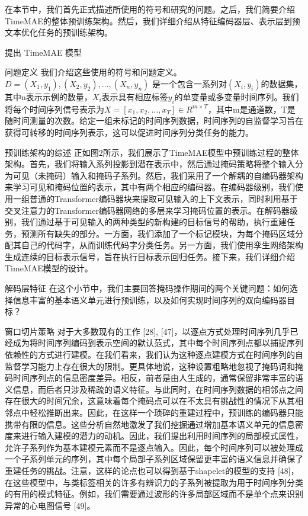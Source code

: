 \documentclass[a4paper,12pt]{article}
\begin{document}
在本节中，我们首先正式描述所使用的符号和研究的问题。之后，我们简要介绍TimeMAE的整体预训练架构。然后，我们详细介绍从特征编码器层、表示层到预文本优化任务的预训练架构。
\begin{section}{提出 TimeMAE 模型}
\begin{subsection}{问题定义}
我们介绍这些使用的符号和问题定义。$D = (X_1, y_1), (X_2, y_2), ...,(X_n, y_n)$ 是一个包含一系列对$(X_i, y_i)$的数据集，其中n表示示例的数量，$X_i$表示具有相应标签$y_i$的单变量或多变量时间序列。我们将每个时间序列信号表示为$X = [x_1, x_2, ..., x_T] \in R^{m×T}$，其中m是通道数，T是随时间测量的次数。给定一组未标记的时间序列数据，时间序列的自监督学习旨在获得可转移的时间序列表示，这可以促进时间序列分类任务的能力。
\end{subsection}
\begin{subsection}{预训练架构的综述}
正如图2所示，我们展示了TimeMAE模型中预训练过程的整体架构。首先，我们将输入系列投影到潜在表示中，然后通过掩码策略将整个输入分为可见（未掩码）输入和掩码子系列。然后，我们采用了一个解耦的自编码器架构来学习可见和掩码位置的表示，其中有两个相应的编码器。在编码器级别，我们使用一组普通的Transformer编码器块来提取可见输入的上下文表示，同时利用基于交叉注意力的Transformer编码器网络的多层来学习掩码位置的表示。在解码器级别，我们通过基于可见输入的两种类型的新构建的目标信号的帮助，执行重建任务，预测所有缺失的部分。一方面，我们添加了一个标记模块，为每个掩码区域分配其自己的代码字，从而训练代码字分类任务。另一方面，我们使用孪生网络架构生成连续的目标表示信号，旨在执行目标表示回归任务。接下来，我们详细介绍TimeMAE模型的设计。
\end{subsection}

\begin{subsection}{解码层特征}
在这个小节中，我们主要回答掩码操作期间的两个关键问题：如何选择信息丰富的基本语义单元进行预训练，以及如何实现时间序列的双向编码器目标？
\begin{subsubsection}{窗口切片策略}
对于大多数现有的工作 [28], [47]，以逐点方式处理时间序列几乎已经成为将时间序列编码到表示空间的默认范式，其中每个时间序列点都以捕捉序列依赖性的方式进行建模。在我们看来，我们认为这种逐点建模方式在时间序列的自监督学习能力上存在很大的限制。更具体地说，这种设置粗略地忽视了掩码词和掩码时间序列点的信息密度差异。相反，前者是由人生成的，通常保留非常丰富的语义信息，而后者只涉及稀疏的语义特征。与此同时，在时间序列数据的相邻点之间存在很大的时间冗余，这意味着每个掩码点可以在不太具有挑战性的情况下从其相邻点中轻松推断出来。因此，在这样一个琐碎的重建过程中，预训练的编码器只能携带有限的信息。这些分析自然地激发了我们挖掘通过增加基本语义单元的信息密度来进行输入建模的潜力的动机。因此，我们提出利用时间序列的局部模式属性，允许子系列作为基本建模元素而不是逐点输入。因此，每个时间序列可以被处理成一个子系列单元的序列，其中每个局部子系列区域保留更丰富的语义信息并确保了重建任务的挑战。注意，这样的论点也可以得到基于shapelet的模型的支持 [48]，在这些模型中，与类标签相关的许多有辨识力的子系列被提取为用于时间序列分类的有用的模式特征。例如，我们需要通过波形的许多局部区域而不是单个点来识别异常的心电图信号 [49]。


\end{subsubsection}
\end{subsection}
\end{section}
\end{document}
